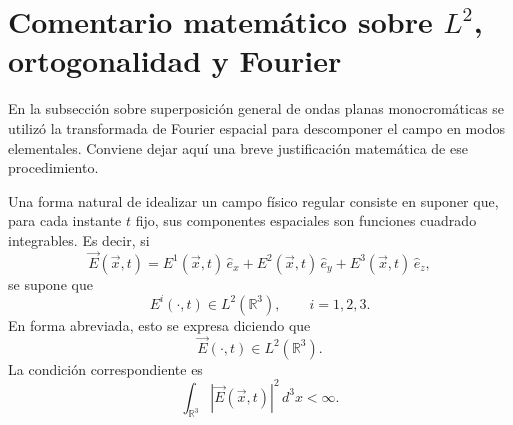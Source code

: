 \documentclass[../main.tex]{subfiles}
\begin{document}
\chapter[Comentario matemático sobre L2, ortogonalidad y Fourier]{Comentario matemático sobre $L^2$, ortogonalidad y Fourier}
\label{ap:l2-fourier}

En la subsección sobre superposición general de ondas planas monocromáticas se utilizó la transformada de Fourier espacial para descomponer el campo en modos elementales. Conviene dejar aquí una breve justificación matemática de ese procedimiento.

Una forma natural de idealizar un campo físico regular consiste en suponer que, para cada instante $t$ fijo, sus componentes espaciales son funciones cuadrado integrables. Es decir, si
\begin{equation*}
    \vec E(\vec x,t)=E^1(\vec x,t)\,\hat e_x+E^2(\vec x,t)\,\hat e_y+E^3(\vec x,t)\,\hat e_z,
\end{equation*}
se supone que
\begin{equation*}
    E^i(\cdot,t)\in L^2(\mathbb R^3),\qquad i=1,2,3.
\end{equation*}
En forma abreviada, esto se expresa diciendo que
\begin{equation*}
    \vec E(\cdot,t)\in L^2(\mathbb R^3).
\end{equation*}
La condición correspondiente es
\begin{equation*}
    \int_{\mathbb R^3}|\vec E(\vec x,t)|^2\,d^3x<\infty.
\end{equation*}
\end{document}
